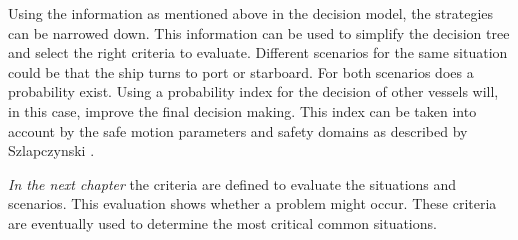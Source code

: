 Using the information as mentioned above in the decision model, the strategies can be narrowed down. This information can be used to simplify the decision tree and select the right criteria to evaluate.
Different scenarios for the same situation could be that the ship turns to port or starboard. For both scenarios does a probability exist. Using a probability index for the decision of other vessels will, in this case, improve the final decision making. This index can be taken into account by the safe motion parameters and safety domains as described by Szlapczynski \cite{Szlapczynski2017}\cite{Szlapczynski2017a}.

\vspace{1.5cm}
\emph{In the next chapter} the criteria are defined to evaluate the situations and scenarios. This evaluation shows whether a problem might occur. These criteria are eventually used to determine the most critical common situations. 

